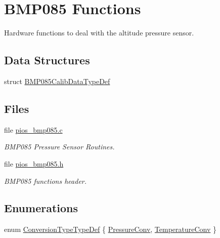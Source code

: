 \hypertarget{group___p_i_o_s___b_m_p085}{\section{\-B\-M\-P085 \-Functions}
\label{group___p_i_o_s___b_m_p085}
}


\-Hardware functions to deal with the altitude pressure sensor.  


\subsection*{\-Data \-Structures}
\begin{DoxyCompactItemize}
\item 
struct \hyperlink{struct_b_m_p085_calib_data_type_def}{\-B\-M\-P085\-Calib\-Data\-Type\-Def}
\end{DoxyCompactItemize}
\subsection*{\-Files}
\begin{DoxyCompactItemize}
\item 
file \hyperlink{pios__bmp085_8c}{pios\-\_\-bmp085.\-c}
\begin{DoxyCompactList}\small\item\em \-B\-M\-P085 \-Pressure \-Sensor \-Routines. \end{DoxyCompactList}\item 
file \hyperlink{pios__bmp085_8h}{pios\-\_\-bmp085.\-h}
\begin{DoxyCompactList}\small\item\em \-B\-M\-P085 functions header. \end{DoxyCompactList}\end{DoxyCompactItemize}
\subsection*{\-Enumerations}
\begin{DoxyCompactItemize}
\item 
enum \hyperlink{group___p_i_o_s___b_m_p085_ga9cea215e6c64f123b3561819d5219785}{\-Conversion\-Type\-Type\-Def} \{ \hyperlink{group___p_i_o_s___b_m_p085_gga9cea215e6c64f123b3561819d5219785a6c9b0031c635c5a250f3a723965c4afd}{\-Pressure\-Conv}, 
\hyperlink{group___p_i_o_s___b_m_p085_gga9cea215e6c64f123b3561819d5219785addc6f7404843f7109baf6db614596ed0}{\-Temperature\-Conv}
 \}
\end{DoxyCompactItemize}
